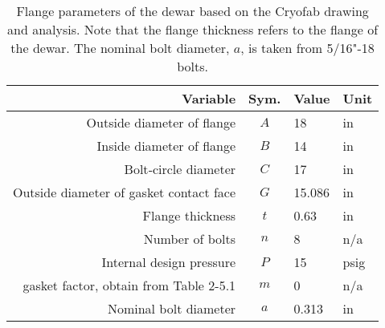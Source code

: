 \begin{table}[h]
\begin{center}
\tabcolsep=10pt
\begin{tabular}{r|c|l|l}
\hline
\hline
Variable & Sym. & Value & Unit \\
\hline
Outside diameter of flange & $A$ & 18 & in \\
Inside diameter of flange & $B$ & 14 & in \\
Bolt‐circle diameter & $C$ & 17 & in \\
Outside diameter of gasket contact face & $G$ & 15.086 & in \\
Flange thickness & $t$ & 0.63 & in \\
Number of bolts & $n$ & 8 & n/a \\
Internal design pressure & $P$ & 15 & psig \\
gasket factor, obtain from Table 2-5.1 & $m$ & 0 & n/a \\
Nominal bolt diameter & $a$ & 0.313 & in \\

\hline
\hline
\end{tabular}
\caption{Flange parameters of the dewar based on the Cryofab drawing
and analysis.  Note that the flange thickness refers to the flange
of the dewar.  The nominal bolt diameter, $a$, is taken from 5/16"-18 bolts.}
\label{table:ring_flange}
\end{center}
\end{table}
